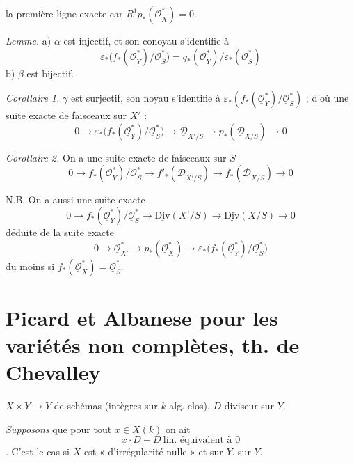 \documentclass[11pt,a4paper]{article}
\begin{document}
la première ligne exacte car $R^1 p_*(\underline{\mathcal{O}}_X^{*}) = 0$.

\emph{Lemme.} a) $\alpha$ est injectif, et son conoyau s'identifie à
\[ \varepsilon_*\bigl(f_*(\underline{\mathcal{O}}_Y^{*}) / \underline{\mathcal{O}}_S^{*}\bigr) = q_*(\underline{\mathcal{O}}_Y^{*}) / \varepsilon_*(\underline{\mathcal{O}}_S^{*}) \]
b) $\beta$ est bijectif.

\emph{Corollaire 1.} $\gamma$ est surjectif, son noyau s'identifie à $\varepsilon_*(f_*(\underline{\mathcal{O}}_Y^{*}) / \underline{\mathcal{O}}_S^{*})$ ; d'où une suite exacte de faisceaux sur $X'$ :
\[ 0 \to \varepsilon_*\bigl(f_*(\underline{\mathcal{O}}_Y^{*}) / \underline{\mathcal{O}}_S^{*}\bigr) \to \underline{\mathcal{D}}_{X'/S} \to p_*(\underline{\mathcal{D}}_{X/S}) \to 0 \]

\emph{Corollaire 2.} On a une suite exacte de faisceaux sur $S$
\[ 0 \to f_*(\underline{\mathcal{O}}_Y^{*}) / \underline{\mathcal{O}}_S^{*} \to f'_*(\underline{\mathcal{D}}_{X'/S}) \to f_*(\underline{\mathcal{D}}_{X/S}) \to 0 \]

N.B. On a aussi une suite exacte
\[ 0 \to f_*(\underline{\mathcal{O}}_Y^{*}) / \underline{\mathcal{O}}_S^{*} \to \underline{\mathrm{Div}}(X'/S) \to \underline{\mathrm{Div}}(X/S) \to 0 \]
déduite de la suite exacte
\[ 0 \to \underline{\mathcal{O}}_{X'}^{*} \to p_*(\underline{\mathcal{O}}_X^{*}) \to \varepsilon_*\bigl(f_*(\underline{\mathcal{O}}_Y^{*}) / \underline{\mathcal{O}}_S^{*}\bigr) \]
du moins si $f_*(\underline{\mathcal{O}}_X^{*}) = \underline{\mathcal{O}}_S^{*}$.

\section{Picard et Albanese pour les variétés non complètes, th. de Chevalley}

 $X \times Y \to Y$  de schémas  (intègres sur $k$ alg. clos), $D$ diviseur sur $Y$.

\emph{Supposons} que pour tout $x \in X(k)$ on ait
\[ x \cdot D - D \ \text{lin. équivalent à } 0 \]
. C'est le cas si $X$ est « d'irrégularité nulle » et  sur $Y$.   sur $Y$.
\end{document}
